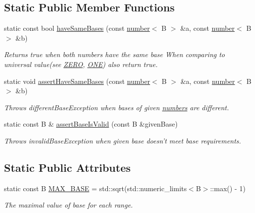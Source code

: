 \subsection*{Static Public Member Functions}
\begin{DoxyCompactItemize}
\item 
static const bool \hyperlink{classcjr_1_1number_a4a519977252ef29149a4cb7834e93c1e}{have\-Same\-Bases} (const \hyperlink{classcjr_1_1number}{number}$<$ B $>$ \&a, const \hyperlink{classcjr_1_1number}{number}$<$ B $>$ \&b)
\begin{DoxyCompactList}\small\item\em Returns true when both numbers have the same base  When comparing to universal value(see \hyperlink{classcjr_1_1number_a0a6d68bdc0fda6943a5d8e0d47fdeb03}{Z\-E\-R\-O}, \hyperlink{classcjr_1_1number_a6327e5cfd5458aff794403400dfe0c13}{O\-N\-E}) also return true. \end{DoxyCompactList}\item 
static void \hyperlink{classcjr_1_1number_a443f424f42b73c8f3bd5f04b45a7d412}{assert\-Have\-Same\-Bases} (const \hyperlink{classcjr_1_1number}{number}$<$ B $>$ \&a, const \hyperlink{classcjr_1_1number}{number}$<$ B $>$ \&b)
\begin{DoxyCompactList}\small\item\em Throws different\-Base\-Exception when bases of given \hyperlink{classcjr_1_1number}{numbers} are different. \end{DoxyCompactList}\item 
static const B \& \hyperlink{classcjr_1_1number_ac817352113440eee2ceddc383d0dcf2d}{assert\-Base\-Is\-Valid} (const B \&given\-Base)
\begin{DoxyCompactList}\small\item\em Throws invalid\-Base\-Exception when given base doesn't meet base requirements. \end{DoxyCompactList}\end{DoxyCompactItemize}
\subsection*{Static Public Attributes}
\begin{DoxyCompactItemize}
\item 
\hypertarget{classcjr_1_1number_a67a279a44630ca637872f9280732aad6}{static const B \hyperlink{classcjr_1_1number_a67a279a44630ca637872f9280732aad6}{M\-A\-X\-\_\-\-B\-A\-S\-E} = std\-::sqrt(std\-::numeric\-\_\-limits$<$B$>$\-::max() -\/ 1)}\label{classcjr_1_1number_a67a279a44630ca637872f9280732aad6}

\begin{DoxyCompactList}\small\item\em The maximal value of base for each range. \end{DoxyCompactList}\end{DoxyCompactItemize}
